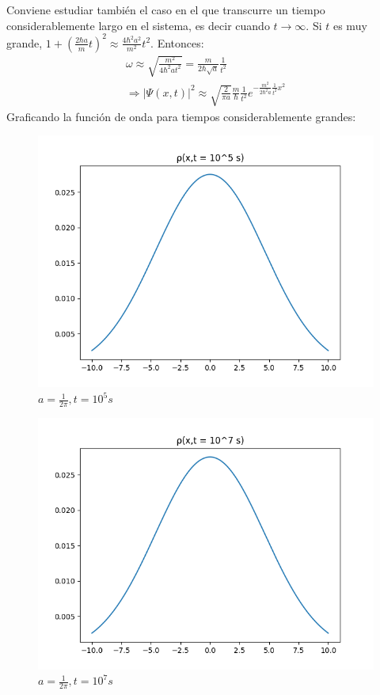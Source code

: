 Conviene estudiar también el caso en el que transcurre un tiempo considerablemente largo en el sistema, es decir cuando 
$t\rightarrow\infty$. Si $t$ es muy grande, $1+\left (\frac{2\hbar a}{m}t \right )^2 \approx \frac{4\hbar^2a^2}{m^2}t^2$. 
Entonces:
\begin{gather*}
    \omega \approx \sqrt{\frac{m^2}{4\hbar^2at^2}} = \frac{m}{2\hbar\sqrt{a}} \frac{1}{t^2} \\
    \Rightarrow \lvert\Psi(x,t)\rvert^2 \approx \sqrt{\frac{2}{\pi a}} \frac{m}{\hbar} \frac{1}{t^2} e^{-\frac{m^2}{2\hbar^2a} \frac{1}{t^2} x^2}
\end{gather*}
Graficando la función de onda para tiempos considerablemente grandes:\\

\begin{figure}[H]
    \includegraphics[scale=0.45]{imagenes/graficas_particulalibre/rho(x,t=10^5).png}
    \caption{\emph{$a = \frac{1}{2\pi}, t = 10^5s$}}
\end{figure}

\begin{figure}[H]
    \includegraphics[scale=0.45]{imagenes/graficas_particulalibre/rho(x,t=10^7).png}
    \caption{\emph{$a = \frac{1}{2\pi}, t = 10^7s$}}
\end{figure}

